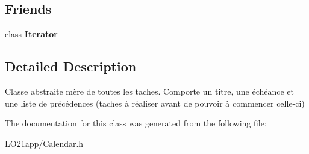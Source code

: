 \subsection*{Friends}
\begin{DoxyCompactItemize}
\item 
\hypertarget{class_tache_a9830fc407400559db7e7783cc10a9394}{}class {\bfseries Iterator}\label{class_tache_a9830fc407400559db7e7783cc10a9394}

\end{DoxyCompactItemize}


\subsection{Detailed Description}
Classe abstraite mère de toutes les taches. Comporte un titre, une échéance et une liste de précédences (taches à réaliser avant de pouvoir à commencer celle-\/ci) 

The documentation for this class was generated from the following file\+:\begin{DoxyCompactItemize}
\item 
L\+O21app/Calendar.\+h\end{DoxyCompactItemize}
